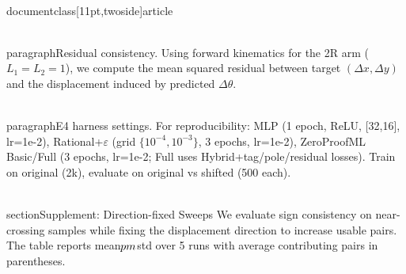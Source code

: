 \\documentclass[11pt,twoside]{article}
\begin{document}
\\paragraph{Residual consistency.} Using forward kinematics for the 2R arm ($L_1=L_2=1$), we compute the mean squared residual between target $(\Delta x,\Delta y)$ and the displacement induced by predicted $\Delta\theta$.

\\paragraph{E4 harness settings.} For reproducibility: MLP (1 epoch, ReLU, [32,16], lr=1e-2), Rational+$\varepsilon$ (grid $\{10^{-4},10^{-3}\}$, 3 epochs, lr=1e-2), ZeroProofML Basic/Full (3 epochs, lr=1e-2; Full uses Hybrid+tag/pole/residual losses). Train on original (2k), evaluate on original vs shifted (500 each).

\\section{Supplement: Direction-fixed Sweeps}
We evaluate sign consistency on near-crossing samples while fixing the displacement direction to increase usable pairs. The table reports mean$\\pm$std over 5 runs with average contributing pairs in parentheses.
\end{document}
